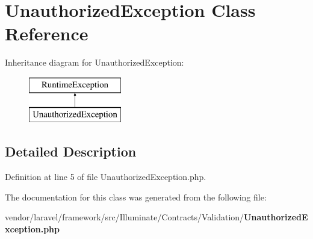 \section{Unauthorized\+Exception Class Reference}
\label{class_illuminate_1_1_contracts_1_1_validation_1_1_unauthorized_exception}
Inheritance diagram for Unauthorized\+Exception\+:\begin{figure}[H]
\begin{center}
\leavevmode
\includegraphics[height=2.000000cm]{class_illuminate_1_1_contracts_1_1_validation_1_1_unauthorized_exception}
\end{center}
\end{figure}


\subsection{Detailed Description}


Definition at line 5 of file Unauthorized\+Exception.\+php.



The documentation for this class was generated from the following file\+:\begin{DoxyCompactItemize}
\item 
vendor/laravel/framework/src/\+Illuminate/\+Contracts/\+Validation/{\bf Unauthorized\+Exception.\+php}\end{DoxyCompactItemize}
